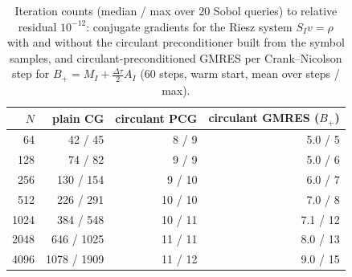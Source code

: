 \begin{table}[!htbp]
\centering\small
\caption{Iteration counts (median / max over 20 Sobol queries) to relative residual $10^{-12}$: conjugate gradients for the Riesz system $S_Iv=\rho$ with and without the circulant preconditioner built from the symbol samples, and circulant-preconditioned GMRES per Crank--Nicolson step for $B_+=M_I+\tfrac{\Delta\tau}{2}A_I$ (60 steps, warm start, mean over steps / max).}
\label{tab:pcg-v9}
\begin{tabular}{rrrr}
\toprule
$N$ & plain CG & circulant PCG & circulant GMRES ($B_+$)\\
\midrule
64 & 42 / 45 & 8 / 9 & 5.0 / 5\\
128 & 74 / 82 & 9 / 9 & 5.0 / 6\\
256 & 130 / 154 & 9 / 10 & 6.0 / 7\\
512 & 226 / 291 & 10 / 10 & 7.0 / 8\\
1024 & 384 / 548 & 10 / 11 & 7.1 / 12\\
2048 & 646 / 1025 & 11 / 11 & 8.0 / 13\\
4096 & 1078 / 1909 & 11 / 12 & 9.0 / 15\\
\bottomrule
\end{tabular}
\end{table}
